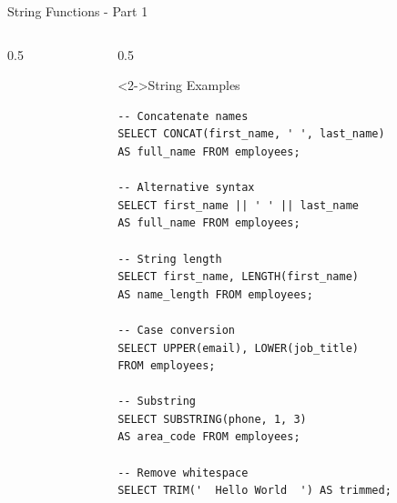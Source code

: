 \documentclass[aspectratio=169,11pt]{beamer}
\begin{document}
\begin{frame}[fragile]{String Functions - Part 1}
\begin{columns}[T]
\begin{column}{0.5\textwidth}
\end{column}

\pause
\begin{column}{0.5\textwidth}
\begin{exampleblock}<2->{String Examples}
\begin{lstlisting}
-- Concatenate names
SELECT CONCAT(first_name, ' ', last_name) 
AS full_name FROM employees;

-- Alternative syntax
SELECT first_name || ' ' || last_name 
AS full_name FROM employees;

-- String length
SELECT first_name, LENGTH(first_name) 
AS name_length FROM employees;

-- Case conversion
SELECT UPPER(email), LOWER(job_title) 
FROM employees;

-- Substring
SELECT SUBSTRING(phone, 1, 3) 
AS area_code FROM employees;

-- Remove whitespace
SELECT TRIM('  Hello World  ') AS trimmed;
\end{lstlisting}
\end{exampleblock}
\end{column}
\end{columns}
\end{frame}
\end{document}
